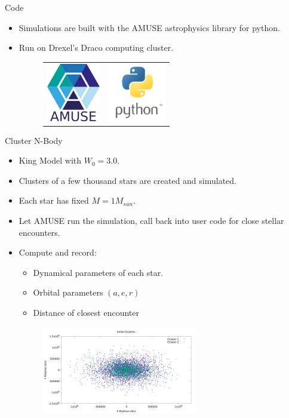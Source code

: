 \documentclass{beamer}
\begin{document}
\begin{frame}{Code}
    \begin{itemize}
        \item Simulations are built with the AMUSE astrophysics library for python.
        \item Run on Drexel's Draco computing cluster.
        \begin{figure}
            \centering
            \begin{tabular}{cc}
                \includegraphics[height=1in]{AmuseLogo} & \includegraphics[height=1in]{PythonLogo}
            \end{tabular}
        \end{figure}
    \end{itemize}
\end{frame}

\begin{frame}{Cluster N-Body}
    \begin{itemize}
        \item King Model with $W_0 = 3.0$.
        \item Clusters of a few thousand stars are created and simulated.
        \item Each star has fixed $M = 1 M_{sun}$.
        \item Let AMUSE run the simulation, call back into user code for close
            stellar encounters.
        \item Compute and record:
            \begin{itemize}
                \item Dynamical parameters of each star.
                \item Orbital parameters $(a, e, r)$
                \item Distance of closest encounter
            \end{itemize}
        \begin{figure}
            \centering
            \includegraphics[height=1.5in]{cluster_superimposed.png}
        \end{figure}
    \end{itemize}

\end{frame}
\end{document}
